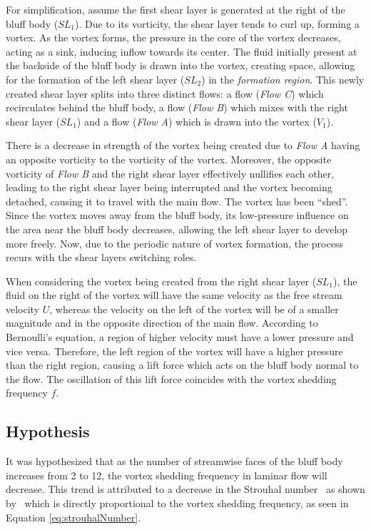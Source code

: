 For simplification, assume the first shear layer is generated at the right of the bluff body ($SL_{1}$). Due to its vorticity, the shear layer tends to curl up, forming a vortex. As the vortex forms, the pressure in the core of the vortex decreases, acting as a sink, inducing inflow towards its center. The fluid initially present at the backside of the bluff body is drawn into the vortex, creating space, allowing for the formation of the left shear layer ($SL_{2}$) in the \textit{formation region}. This newly created shear layer splits into three distinct flows: a flow (\textit{Flow C}) which recirculates behind the bluff body, a flow (\textit{Flow B}) which mixes with the right shear layer ($SL_1$) and a flow (\textit{Flow A}) which is drawn into the vortex ($V_{1}$).

There is a decrease in strength of the vortex being created due to \textit{Flow A} having an opposite vorticity to the vorticity of the vortex. Moreover, the opposite vorticity of \textit{Flow B} and the right shear layer effectively nullifies each other, leading to the right shear layer being interrupted and the vortex becoming detached, causing it to travel with the main flow. The vortex has been “shed”. Since the vortex moves away from the bluff body, its low-pressure influence on the area near the bluff body decreases, allowing the left shear layer to develop more freely. Now, due to the periodic nature of vortex formation, the process recurs with the shear layers switching roles. 

When considering the vortex being created from the right shear layer ($SL_1$), the fluid on the right of the vortex will have the same velocity as the free stream velocity $U$, whereas the velocity on the left of the vortex will be of a smaller magnitude and in the opposite direction of the main flow. According to Bernoulli’s equation, a region of higher velocity must have a lower pressure and vice versa. Therefore, the left region of the vortex will have a higher pressure than the right region, causing a lift force which acts on the bluff body normal to the flow. The oscillation of this lift force coincides with the vortex shedding frequency $f$.

\subsection{Hypothesis}
It was hypothesized that as the number of streamwise faces of the bluff body increases from 2 to 12, the vortex shedding frequency in laminar flow will decrease. This trend is attributed to a decrease in the Strouhal number \textemdash\ as shown by \textcite{goncalves1999strouhal} \textemdash\ which is directly proportional to the vortex shedding frequency, as seen in Equation \eqref{eq:strouhalNumber}. 




